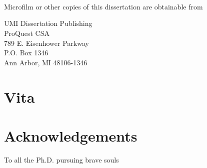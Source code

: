 \documentclass[12pt,draft,letterpaper]{report}
\newcommand{\thesisdedication}{To all the Ph.D. pursuing brave souls}
\begin{document}
\noindent
\makebox[\textwidth]{\hfill\makebox[3in]{\hrulefill}}\\
\makebox[\textwidth]{\hfill\makebox[3in]{\rule[-4pt]{2in}{1pt}}}\\
\\

\doublespacing

\begin{center}
Microfilm or other copies of this dissertation are obtainable from
\vspace{4in}

UMI Dissertation Publishing\\
ProQuest CSA\\
789 E. Eisenhower Parkway\\
P.O. Box 1346\\
Ann Arbor, MI 48106-1346

\end{center}
\newpage

\section*{Vita}

\newpage



\section*{Acknowledgements}

\newpage

\vspace*{\fill}
\begin{center}
  \thesisdedication%
\end{center}
\vfill
\newpage


\end{document}
